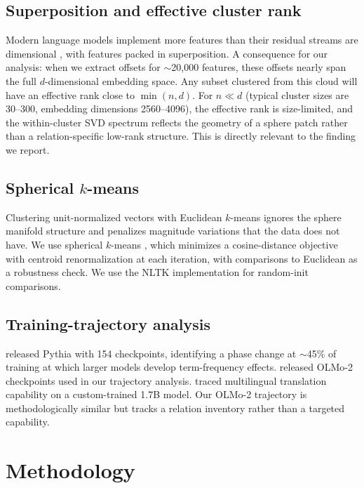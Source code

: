 \documentclass[11pt,letterpaper]{article}
\begin{document}
\subsection{Superposition and effective cluster rank}

Modern language models implement more features than their residual streams are dimensional \citep{elhage2022toy}, with features packed in superposition. A consequence for our analysis: when we extract offsets for $\sim$20{,}000 features, these offsets nearly span the full $d$-dimensional embedding space. Any subset clustered from this cloud will have an effective rank close to $\min(n, d)$. For $n \ll d$ (typical cluster sizes are 30--300, embedding dimensions 2560--4096), the effective rank is size-limited, and the within-cluster SVD spectrum reflects the geometry of a sphere patch rather than a relation-specific low-rank structure. This is directly relevant to the finding we report.

\subsection{Spherical $k$-means}

Clustering unit-normalized vectors with Euclidean $k$-means ignores the sphere manifold structure and penalizes magnitude variations that the data does not have. We use spherical $k$-means \citep{dhillon2001concept}, which minimizes a cosine-distance objective with centroid renormalization at each iteration, with comparisons to Euclidean as a robustness check. We use the NLTK implementation \citep{bird2009natural} for random-init comparisons.

\subsection{Training-trajectory analysis}

\citet{biderman2023pythia} released Pythia with 154 checkpoints, identifying a phase change at $\sim$45\% of training at which larger models develop term-frequency effects. \citet{olmo2024olmo2} released OLMo-2 checkpoints used in our trajectory analysis. \citet{copy_first_translate_later_2026} traced multilingual translation capability on a custom-trained 1.7B model. Our OLMo-2 trajectory is methodologically similar but tracks a relation inventory rather than a targeted capability.

\section{Methodology}
\label{sec:methodology}
\end{document}
